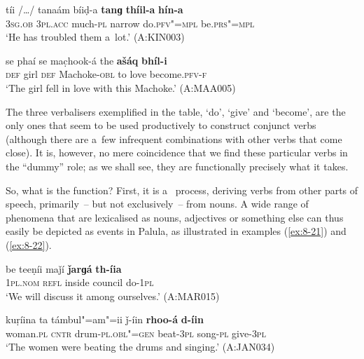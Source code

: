 \begin{exe}
\begin{exe}
\ex
\label{ex:8-19}
\gll tíi /{\ldots}/ tanaám bíiḍ-a \textbf{tanɡ} \textbf{thíil-a} \textbf{hín-a} \\
\textsc{3sg.ob} {} \textsc{3pl.acc} much-\textsc{pl} narrow do.\textsc{pfv"=mpl} be.\textsc{prs"=mpl} \\
\glt `He has troubled them a~lot.' (A:KIN003)
\end{exe}
\begin{exe}
\ex
\label{ex:8-20}
\gll se phaí se mac̣hook-á the \textbf{ašáq} \textbf{bhíl-i} \\
\textsc{def} girl \textsc{def} Machoke-\textsc{obl} to  love become.\textsc{pfv-f} \\
\glt `The girl fell in love with this Machoke.' (A:MAA005)
\end{exe}

The three verbalisers exemplified in the table, `do', `give' and `become', are the only ones that seem to be used productively to construct conjunct verbs (although there are a~few infrequent combinations with other verbs that come close). It is, however, no mere coincidence that we find these particular verbs in the ``dummy'' role; as we shall see, they are functionally precisely what it takes. 


So, what is the function? First, it is a~ process, deriving verbs from other parts of speech, primarily~-- but not exclusively~-- from nouns. A wide range of phenomena that are lexicalised as nouns, adjectives or something else can thus easily be depicted as events in Palula, as illustrated in examples (\ref{ex:8-21}) and (\ref{ex:8-22}). 

\begin{exe}
\ex
\label{ex:8-21}
\gll be teeṇíi maǰí \textbf{ǰarɡá} \textbf{th-íia} \\
\textsc{1}\textsc{pl.nom} \textsc{refl} inside council do-\textsc{1pl} \\
\glt `We will discuss it among ourselves.' (A:MAR015)
\end{exe}
\begin{exe}
\ex
\label{ex:8-22}
\gll kuṛíina ta támbul"=am"=ii ǰ-íin \textbf{rhoo-á} \textbf{d-íin} \\
woman.\textsc{pl} \textsc{cntr} drum-\textsc{pl.obl"=gen} beat-\textsc{3pl} song-\textsc{pl} give-\textsc{3pl}\\
\glt `The women were beating the drums and singing.' (A:JAN034)
\end{exe}


\end{exe}
